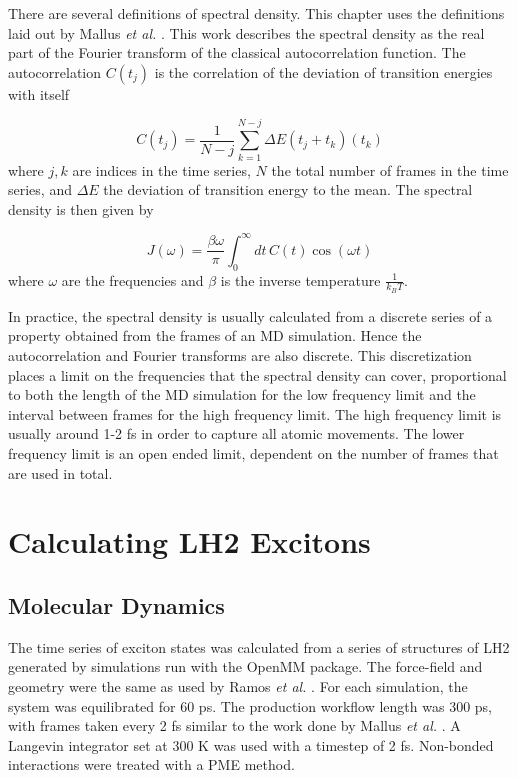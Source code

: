 There are several definitions of spectral density. This chapter uses the definitions
laid out by Mallus \emph{et al.} \cite{Mallus2018}. This work describes the spectral 
density as the real part of the Fourier transform of the classical autocorrelation 
function. The autocorrelation $C\left(t_j\right)$ is the correlation of the deviation 
of transition energies with itself

\begin{equation}
    C\left(t_j\right) = \frac{1}{N-j} \sum^{N-j}_{k=1} \Delta E \left(t_j + t_k\right) \left(t_k\right)
\end{equation}
%
where $j,k$ are indices in the time series, $N$ the total number of frames in the
time series, and $\Delta E$ the deviation of transition energy to the mean. The
spectral density is then given by

\begin{equation}
    J\left(\omega\right) = \frac{\beta \omega}{\pi} \int^\infty_0 dt \, C\left(t\right) \cos \left(\omega t\right)
\end{equation}
%
where $\omega$ are the frequencies and $\beta$ is the inverse temperature $\frac{1}{k_B T}$.

In practice, the spectral density is usually calculated from a discrete series of 
a property obtained from the frames of an MD simulation. Hence the autocorrelation
and Fourier transforms are also discrete. This discretization places a limit on 
the frequencies that the spectral density can cover, proportional to both the length 
of the MD simulation for the low frequency limit and the interval between frames 
for the high frequency limit. The high frequency limit is usually around 1-2 fs 
in order to capture all atomic movements. The lower frequency limit is an open ended
limit, dependent on the number of frames that are used in total.

\section{Calculating LH2 Excitons}
\label{sec:MD}

\subsection{Molecular Dynamics}
\label{subsec:specdens_MD}

The time series of exciton states was calculated from a series of structures of 
LH2 generated by simulations run with the OpenMM package. The force-field and geometry
were the same as used by Ramos \emph{et al.} \cite{Mennucci2019}. For each simulation,
the system was equilibrated for 60 ps. The production workflow length was 300 ps, 
with frames taken every 2 fs similar to the work done by Mallus \emph{et al.} \cite{Mallus2018}.
A Langevin integrator set at 300 K was used with a timestep of 2 fs. Non-bonded
interactions were treated with a PME method.

